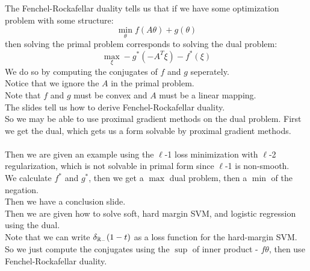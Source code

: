 \documentclass[12pt]{article}
\begin{document}
The Fenchel-Rockafellar duality tells
us that if we have some optimization problem
with some structure:
\[ \min_\theta f(A\theta) + g(\theta) \]
then solving the primal problem corresponds
to solving the dual problem:
\[ \max_\xi - g^*(-A^T\xi) - f^*(\xi) \]
We do so by computing the conjugates of $f$
and $g$ seperately. \\
Notice that we ignore the $A$
in the primal problem. \\
Note that $f$ and $g$ must be convex
and $A$ must be a linear mapping. \\

The slides tell us how to derive
Fenchel-Rockafellar duality. \\

So we may be able to use proximal gradient
methods on the dual problem.
First we get the dual, which 
gets us a form solvable by proximal gradient
methods. \\

 \\

Then we are given an example using the
$\ell$-1 loss minimization with $\ell$-2
regularization, which is not solvable
in primal form since $\ell$-1 is non-smooth. \\

We calculate $f^*$ and $g^*$,
then we get a $\max$ dual problem, 
then a $\min$ of the negation. \\

Then we have a conclusion slide. \\

Then we are given how to solve soft,
hard margin SVM, and logistic regression
using the dual. \\

Note that we can write $\delta_{\mathbb{R}_-}(1-t)$
as a loss function for the hard-margin SVM. \\

So we just compute the conjugates
using the $\sup$ of inner product - $f\theta$,
then use Fenchel-Rockafellar duality. \\
\end{document}
